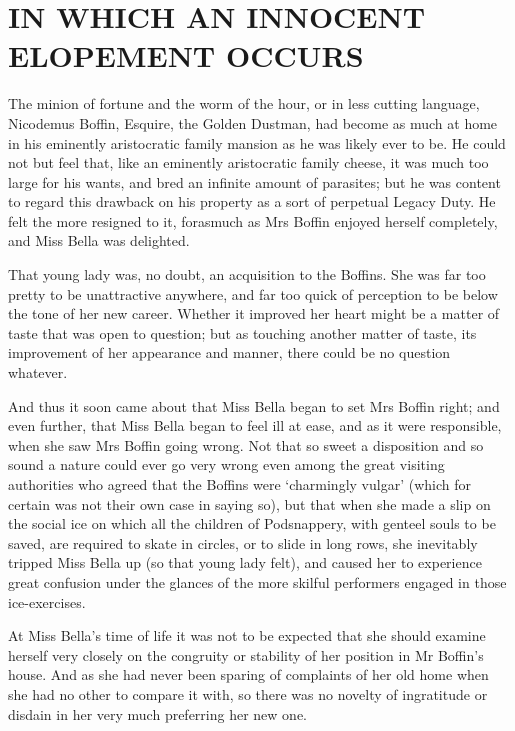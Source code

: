 
\chapter{IN WHICH AN INNOCENT ELOPEMENT OCCURS}

The minion of fortune and the worm of the hour, or in less cutting
language, Nicodemus Boffin, Esquire, the Golden Dustman, had become
as much at home in his eminently aristocratic family mansion as he
was likely ever to be. He could not but feel that, like an eminently
aristocratic family cheese, it was much too large for his wants, and
bred an infinite amount of parasites; but he was content to regard this
drawback on his property as a sort of perpetual Legacy Duty. He felt the
more resigned to it, forasmuch as Mrs Boffin enjoyed herself completely,
and Miss Bella was delighted.

That young lady was, no doubt, an acquisition to the Boffins. She
was far too pretty to be unattractive anywhere, and far too quick of
perception to be below the tone of her new career. Whether it improved
her heart might be a matter of taste that was open to question; but as
touching another matter of taste, its improvement of her appearance and
manner, there could be no question whatever.

And thus it soon came about that Miss Bella began to set Mrs Boffin
right; and even further, that Miss Bella began to feel ill at ease, and
as it were responsible, when she saw Mrs Boffin going wrong. Not that so
sweet a disposition and so sound a nature could ever go very wrong even
among the great visiting authorities who agreed that the Boffins were
‘charmingly vulgar’ (which for certain was not their own case in saying
so), but that when she made a slip on the social ice on which all the
children of Podsnappery, with genteel souls to be saved, are required to
skate in circles, or to slide in long rows, she inevitably tripped Miss
Bella up (so that young lady felt), and caused her to experience great
confusion under the glances of the more skilful performers engaged in
those ice-exercises.

At Miss Bella’s time of life it was not to be expected that she should
examine herself very closely on the congruity or stability of her
position in Mr Boffin’s house. And as she had never been sparing of
complaints of her old home when she had no other to compare it with,
so there was no novelty of ingratitude or disdain in her very much
preferring her new one.


